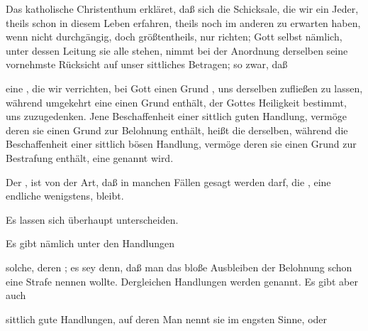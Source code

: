 \begin{aufza}
\item Das katholische Christenthum erkläret, daß sich die Schicksale, die wir ein Jeder, theils schon in diesem Leben erfahren, theils noch im anderen zu erwarten haben, wenn nicht durchgängig, doch größtentheils, nur  richten; Gott selbst nämlich, unter dessen Leitung sie alle stehen, nimmt bei der Anordnung derselben seine vornehmste Rücksicht auf unser sittliches Betragen; so zwar, daß
\item eine , die wir verrichten, bei Gott einen Grund , uns  derselben zufließen zu lassen, während umgekehrt eine  einen Grund enthält, der Gottes Heiligkeit bestimmt, uns  zuzugedenken. Jene Beschaffenheit einer sittlich guten Handlung, vermöge deren sie einen Grund zur Belohnung enthält, heißt die  derselben, während die Beschaffenheit einer sittlich bösen Handlung, vermöge deren sie einen Grund zur Bestrafung enthält, eine  genannt wird.~
\item Der , ist von der Art, daß in manchen Fällen gesagt werden darf, die , eine endliche wenigstens, bleibt.
\item {}
\item Es lassen sich überhaupt  unterscheiden.
\begin{aufzb}
\item Es gibt nämlich unter den  Handlungen
\begin{aufzc}
\item solche, deren ; es sey denn, daß man das bloße Ausbleiben der Belohnung schon eine Strafe nennen wollte. Dergleichen Handlungen werden  genannt. Es gibt aber auch
\item sittlich gute Handlungen, auf deren  Man nennt sie  im engsten Sinne, oder 

\end{aufzc}
\end{aufzb}
\end{aufza}
